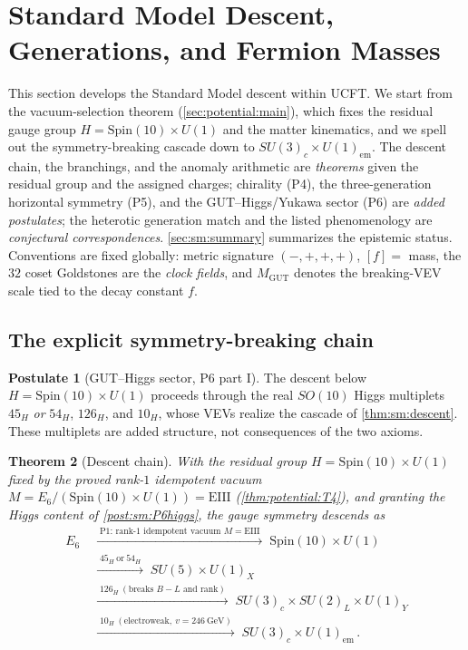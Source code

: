 \documentclass[11pt]{article}
\theoremstyle{plain}
\newtheorem{theorem}{Theorem}[section]
\theoremstyle{definition}
\newtheorem{postulate}[theorem]{Postulate}
\theoremstyle{remark}
\begin{document}
\section{Standard Model Descent, Generations, and Fermion Masses}
\label{sec:sm:main}

This section develops the Standard Model descent within UCFT. We start
from the vacuum-selection theorem (\autoref{sec:potential:main}), which fixes
the residual gauge group $H = \mathrm{Spin}(10)\times U(1)$ and the matter
kinematics, and we spell out the symmetry-breaking cascade down to
$SU(3)_c\times U(1)_{\mathrm{em}}$. The descent chain, the branchings, and the
anomaly arithmetic are \emph{theorems} given the residual group and the assigned
charges; chirality (P4), the three-generation horizontal symmetry (P5), and the
GUT--Higgs/Yukawa sector (P6) are \emph{added postulates}; the heterotic
generation match and the listed phenomenology are \emph{conjectural
correspondences}. \autoref{sec:sm:summary} summarizes the epistemic status.
Conventions are fixed globally: metric signature $(-,+,+,+)$, $[f]=$ mass, the
$32$ coset Goldstones are the \emph{clock fields}, and $M_{\mathrm{GUT}}$ denotes
the breaking-VEV scale tied to the decay constant $f$.

\subsection{The explicit symmetry-breaking chain}
\label{sec:sm:descent}

\begin{postulate}[GUT--Higgs sector, P6 part I]\label{post:sm:P6higgs}
The descent below $H=\mathrm{Spin}(10)\times U(1)$ proceeds through the real
$SO(10)$ Higgs multiplets $45_H$ \emph{or} $54_H$, $126_H$, and $10_H$, whose VEVs
realize the cascade of \autoref{thm:sm:descent}. These multiplets are added
structure, not consequences of the two axioms.
\end{postulate}

\begin{theorem}[Descent chain]\label{thm:sm:descent}
With the residual group $H=\mathrm{Spin}(10)\times U(1)$ fixed by the proved
rank-$1$ idempotent vacuum $M=E_6/(\mathrm{Spin}(10)\times U(1))=\mathrm{EIII}$
(\autoref{thm:potential:T4}), and granting the Higgs content of
\autoref{post:sm:P6higgs}, the gauge symmetry descends as
\begin{equation}\label{eq:sm:chain}
\begin{aligned}
E_6
 &\;\xrightarrow{\;\text{P1: rank-}1\text{ idempotent vacuum }M=\mathrm{EIII}\;}\;
 \mathrm{Spin}(10)\times U(1) \\
 &\;\xrightarrow{\;45_H\ \text{or}\ 54_H\;}\;
 SU(5)\times U(1)_X \\
 &\;\xrightarrow{\;126_H\ (\text{breaks }B\!-\!L\text{ and rank})\;}\;
 SU(3)_c\times SU(2)_L\times U(1)_Y \\
 &\;\xrightarrow{\;10_H\ (\text{electroweak},\ v=246\ \mathrm{GeV})\;}\;
 SU(3)_c\times U(1)_{\mathrm{em}}\,.
\end{aligned}
\end{equation}
\end{theorem}
\end{document}
